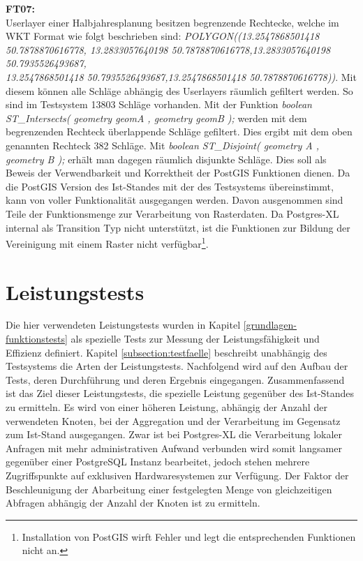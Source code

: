 \textbf{FT07:}\\
Userlayer einer Halbjahresplanung besitzen begrenzende Rechtecke, welche im WKT Format wie folgt beschrieben sind: \textit{POLYGON((13.2547868501418 50.7878870616778,
13.2833057640198 50.7878870616778,13.2833057640198 50.7935526493687,\\
13.2547868501418 50.7935526493687,13.2547868501418 50.7878870616778))}.
Mit diesem können alle Schläge abhängig des Userlayers räumlich gefiltert werden.
So sind im Testsystem 13803 Schläge vorhanden.
Mit der Funktion \textit{boolean ST\_{}Intersects( geometry geomA , geometry geomB );} werden mit dem begrenzenden Rechteck überlappende Schläge gefiltert.
Dies ergibt mit dem oben genannten Rechteck 382 Schläge.
Mit \textit{boolean ST\_{}Disjoint( geometry A , geometry B );} erhält man dagegen räumlich disjunkte Schläge.
Dies soll als Beweis der Verwendbarkeit und Korrektheit der PostGIS Funktionen dienen.
Da die PostGIS Version des Ist-Standes mit der des Testsystems übereinstimmt, kann von voller Funktionalität  ausgegangen werden.
Davon ausgenommen sind Teile der Funktionsmenge zur Verarbeitung von Rasterdaten.
Da Postgres-XL internal als Transition Typ nicht unterstützt, ist die Funktionen zur Bildung der Vereinigung mit einem Raster nicht verfügbar\footnote{Installation von PostGIS wirft Fehler und legt die entsprechenden Funktionen nicht an.}.



\section{Leistungstests}
Die hier verwendeten Leistungstests wurden in Kapitel \ref{grundlagen-funktionstests} als spezielle Tests zur Messung der Leistungsfähigkeit und Effizienz definiert.
Kapitel \ref{subsection:testfaelle} beschreibt unabhängig des Testsystems die Arten der Leistungstests.
Nachfolgend wird auf den Aufbau der Tests, deren Durchführung und deren Ergebnis eingegangen.
Zusammenfassend ist das Ziel dieser Leistungstests, die spezielle Leistung gegenüber des Ist-Standes zu ermitteln.
Es wird von einer höheren Leistung, abhängig der Anzahl der verwendeten Knoten, bei der Aggregation und der Verarbeitung im Gegensatz zum Ist-Stand ausgegangen.
Zwar ist bei Postgres-XL die Verarbeitung lokaler Anfragen mit mehr administrativen Aufwand verbunden  wird somit langsamer gegenüber einer PostgreSQL Instanz bearbeitet, jedoch stehen mehrere Zugriffspunkte auf exklusiven Hardwaresystemen zur Verfügung.
Der Faktor der Beschleunigung der Abarbeitung einer festgelegten Menge von gleichzeitigen Abfragen abhängig der Anzahl der Knoten ist zu ermitteln.%


